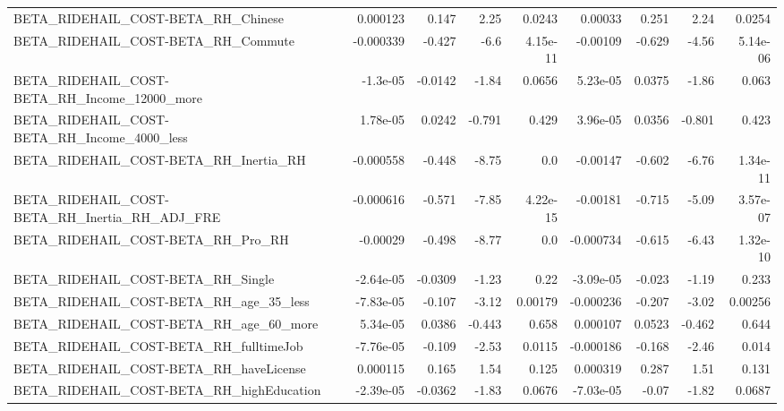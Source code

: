 \begin{tabular}{lrrrrrrrr}
BETA\_RIDEHAIL\_COST-BETA\_RH\_Chinese                 &    0.000123 &        0.147 &     2.25 &   0.0243 &    0.00033 &       0.251 &         2.24 &        0.0254 \\
BETA\_RIDEHAIL\_COST-BETA\_RH\_Commute                 &   -0.000339 &       -0.427 &     -6.6 & 4.15e-11 &   -0.00109 &      -0.629 &        -4.56 &      5.14e-06 \\
BETA\_RIDEHAIL\_COST-BETA\_RH\_Income\_12000\_more       &    -1.3e-05 &      -0.0142 &    -1.84 &   0.0656 &   5.23e-05 &      0.0375 &        -1.86 &         0.063 \\
BETA\_RIDEHAIL\_COST-BETA\_RH\_Income\_4000\_less        &    1.78e-05 &       0.0242 &   -0.791 &    0.429 &   3.96e-05 &      0.0356 &       -0.801 &         0.423 \\
BETA\_RIDEHAIL\_COST-BETA\_RH\_Inertia\_RH              &   -0.000558 &       -0.448 &    -8.75 &      0.0 &   -0.00147 &      -0.602 &        -6.76 &      1.34e-11 \\
BETA\_RIDEHAIL\_COST-BETA\_RH\_Inertia\_RH\_ADJ\_FRE      &   -0.000616 &       -0.571 &    -7.85 & 4.22e-15 &   -0.00181 &      -0.715 &        -5.09 &      3.57e-07 \\
BETA\_RIDEHAIL\_COST-BETA\_RH\_Pro\_RH                  &    -0.00029 &       -0.498 &    -8.77 &      0.0 &  -0.000734 &      -0.615 &        -6.43 &      1.32e-10 \\
BETA\_RIDEHAIL\_COST-BETA\_RH\_Single                  &   -2.64e-05 &      -0.0309 &    -1.23 &     0.22 &  -3.09e-05 &      -0.023 &        -1.19 &         0.233 \\
BETA\_RIDEHAIL\_COST-BETA\_RH\_age\_35\_less             &   -7.83e-05 &       -0.107 &    -3.12 &  0.00179 &  -0.000236 &      -0.207 &        -3.02 &       0.00256 \\
BETA\_RIDEHAIL\_COST-BETA\_RH\_age\_60\_more             &    5.34e-05 &       0.0386 &   -0.443 &    0.658 &   0.000107 &      0.0523 &       -0.462 &         0.644 \\
BETA\_RIDEHAIL\_COST-BETA\_RH\_fulltimeJob             &   -7.76e-05 &       -0.109 &    -2.53 &   0.0115 &  -0.000186 &      -0.168 &        -2.46 &         0.014 \\
BETA\_RIDEHAIL\_COST-BETA\_RH\_haveLicense             &    0.000115 &        0.165 &     1.54 &    0.125 &   0.000319 &       0.287 &         1.51 &         0.131 \\
BETA\_RIDEHAIL\_COST-BETA\_RH\_highEducation           &   -2.39e-05 &      -0.0362 &    -1.83 &   0.0676 &  -7.03e-05 &       -0.07 &        -1.82 &        0.0687 \\

\end{tabular}
